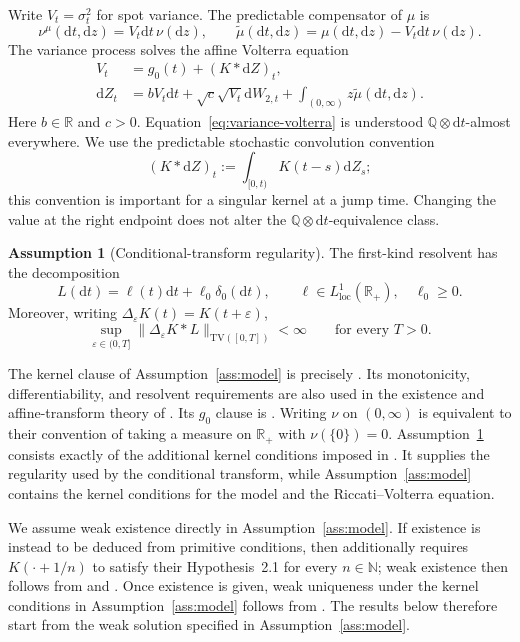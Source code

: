 \documentclass[11pt]{article}
\theoremstyle{definition}
\newtheorem{assumption}[theorem]{Assumption}
\theoremstyle{remark}
\newcommand{\R}{\mathbb{R}}
\newcommand{\Q}{\mathbb{Q}}
\newcommand{\1}{\mathbf{1}}
\newcommand{\mut}{\widetilde\mu}
\newcommand{\dd}{\mathrm{d}}
\begin{document}
Write $V_t=\sigma_t^2$ for spot variance. The predictable compensator of
$\mu$ is
\begin{equation}
\label{eq:compensator}
 \nu^\mu(\dd t,\dd z)=V_t\dd t\,\nu(\dd z),
 \qquad
 \mut(\dd t,\dd z)=\mu(\dd t,\dd z)-V_t\dd t\,\nu(\dd z).
\end{equation}
The variance process solves the affine Volterra equation
\begin{align}
 V_t&=g_0(t)+(K*\dd Z)_t,
 \label{eq:variance-volterra}\\
 \dd Z_t&=bV_t\dd t+\sqrt{c}\sqrt{V_t}\dd W_{2,t}
       +\int_{(0,\infty)}z\mut(\dd t,\dd z).
 \label{eq:variance-driver}
\end{align}
Here $b\in\R$ and $c>0$. Equation~\eqref{eq:variance-volterra} is understood
$\Q\otimes\dd t$-almost everywhere. We use the predictable stochastic
convolution convention
\[
 (K*\dd Z)_t:=\int_{[0,t)}K(t-s)\dd Z_s;
\]
this convention is important for a singular kernel at a jump time. Changing
the value at the right endpoint does not alter the
$\Q\otimes\dd t$-equivalence class.

\begin{assumption}[Conditional-transform regularity]
\label{ass:transform}
The first-kind resolvent has the decomposition
\[
 L(\dd t)=\ell(t)\dd t+\ell_0\delta_0(\dd t),
 \qquad \ell\in L^1_{\mathrm{loc}}(\R_+),\quad \ell_0\geq0.
\]
Moreover, writing $\Delta_\varepsilon K(t)=K(t+\varepsilon)$,
\[
 \sup_{\varepsilon\in(0,T]}
 \|\Delta_\varepsilon K*L\|_{\mathrm{TV}([0,T])}<\infty
 \qquad\text{for every }T>0.
\]
\end{assumption}

The kernel clause of Assumption~\ref{ass:model} is precisely
\citet[Hypothesis~2.1]{bondi2024}. Its monotonicity, differentiability, and
resolvent requirements are also used in the existence and affine-transform
theory of \citet{abijaberlarssonpulido2019,bondi2024affine}. Its
$g_0$ clause is \citet[Hypothesis~2.2]{bondi2024}. Writing $\nu$ on
$(0,\infty)$ is equivalent to their convention of taking a measure on
$\R_+$ with $\nu(\{0\})=0$. Assumption~\ref{ass:transform} consists exactly
of the additional kernel conditions imposed in
\citet[Theorem~3.3]{bondi2024}. It supplies the regularity used by the
conditional transform, while Assumption~\ref{ass:model} contains the kernel
conditions for the model and the Riccati--Volterra equation.

We assume weak existence directly in Assumption~\ref{ass:model}. If existence
is instead to be deduced from primitive conditions, then
\citet[Remark~2.3]{bondi2024} additionally requires $K(\cdot+1/n)$ to satisfy
their Hypothesis~2.1 for every $n\in\mathbb N$; weak existence then follows
from \citet[Theorem~2.13]{abijaber2021weak} and
\citet[Lemma~9]{bondi2024affine}. Once existence is given, weak uniqueness
under the kernel conditions in Assumption~\ref{ass:model} follows from
\citet[Corollary~12]{bondi2024affine}. The results below therefore start from
the weak solution specified in Assumption~\ref{ass:model}.
\end{document}
